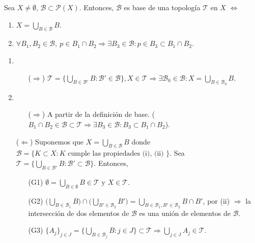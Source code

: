 \begin{theo}
  Sea $X \neq \emptyset$, $\mathcal{B} \subset \mathcal{P}(X)$. Entonces, $\mathcal{B}$ es base de una topología $\mathcal{T}$ en $X$ $ \Leftrightarrow$
  \begin{enumerate}[label=(\roman*)]
    \item $X = \bigcup_{B \in \mathcal{B}} B$.
    \item $\forall B_{1}, B_{2} \in \mathcal{B}, \ p \in B_{1} \cap B_{2} \Rightarrow \exists B_{3} \in \mathcal{B}: p \in B_{3} \subset B_{1} \cap B_{2}$.
  \end{enumerate}
\end{theo}

\begin{dem}
  \begin{enumerate}[label=(\roman*)]
    \item 
      \begin{enumerate}[label=(\roman*)]
        \item [($\Rightarrow$)] $\mathcal{T} = \big\{ \bigcup_{B \in \mathcal{B}'} B : \mathcal{B}' \in \mathcal{B} \big\}, X \in \mathcal{T} \Rightarrow \exists \mathcal{B}_{0} \in \mathcal{B}: X = \bigcup_{B \in \mathcal{B}_{0}} B$.
      \end{enumerate}
    \item
      \begin{enumerate}[label=(\roman*)]
        \item [($\Rightarrow$)] A partir de la definición de base. ($B_{1} \cap B_{2} \in \mathcal{B} \subset \mathcal{T} \Rightarrow \exists B_{3} \in \mathcal{B}: B_{3} \subset B_{1} \cap B_{2} $).
      \end{enumerate}
    \item [($\Leftarrow$)] Suponemos que $ X = \bigcup_{B \in \mathcal{B}}B$  donde $\mathcal{B} = \{ K \subset X : K \text{ cumple las propiedades (i), (ii) }\}$. Sea $ \mathcal{T} = \{ \bigcup_{B \in \mathcal{B'}} B : \mathcal{B'} \subset \mathcal{B} \}$. Entonces,
    \begin{enumerate}[label=(\roman*)]
      \item [(G1)] $\emptyset = \bigcup_{B \in \emptyset} B \in \mathcal{T}$ y $X \in \mathcal{T}$.
      \item [(G2)] $\big ( \bigcup_{B \in \mathcal{B}_{1}} B \big ) \cap \big ( \bigcup_{B' \in \mathcal{B}_{2}} B' \big ) = \bigcup_{B \in \mathcal{B}_{1}, B' \in \mathcal{B}_{2}} B \cap B'$, por (ii) $ \Rightarrow $ la intersección de dos elementos de $\mathcal{B}$ es una unión de elementos de $\mathcal{B}$.
      \item [(G3)] $ \{ A_{j} \}_{j \in J} = \{ \bigcup_{B \in \mathcal{B}_{j}} B : j \in J \} \subset \mathcal{T} \Rightarrow \bigcup_{j \in J} A_{j} \in \mathcal{T}$.
    \end{enumerate}
  \end{enumerate} 
\end{dem}

